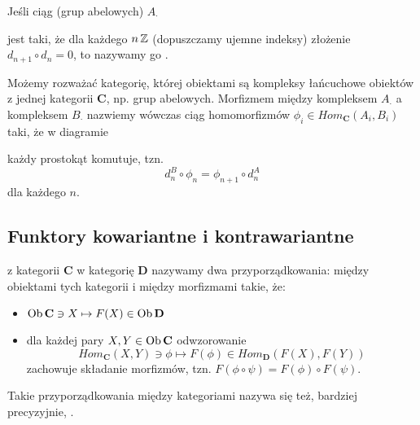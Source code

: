 \begin{definition}
  Jeśli ciąg (grup abelowych) $A_\cdot$
  \begin{center}\end{center}
  jest taki, że dla każdego $n\operatorname{\mathbb{Z}}$ (dopuszczamy ujemne indeksy) złożenie $d_{n+1}\circ d_n=0$, to nazywamy go .
\end{definition}

Możemy rozważać kategorię, której obiektami są kompleksy łańcuchowe obiektów z jednej kategorii $\mathbf{C}$, np. grup abelowych. Morfizmem między kompleksem $A_\cdot$ a kompleksem $B_\cdot$ nazwiemy wówczas ciąg homomorfizmów $\phi_i\in Hom_{\mathbf{C}}(A_i,B_i)$ taki, że w diagramie
  \begin{center}\end{center}
każdy prostokąt komutuje, tzn.
$$d^B_n\circ\phi_n=\phi_{n+1}\circ d_{n}^A$$
dla każdego $n$.

\subsection{Funktory kowariantne i kontrawariantne}

\begin{definition}[funktor]
   z kategorii $\mathbf{C}$ w kategorię $\mathbf{D}$ nazywamy dwa przyporządkowania: między obiektami tych kategorii i między morfizmami takie, że:
  \begin{itemize}
    \item $\operatorname{Ob}\mathbf{C}\ni X\mapsto F(X)\in\operatorname{Ob}\mathbf{D}$
    \item dla każdej pary $X,Y\in\operatorname{Ob}\mathbf{C}$ odwzorowanie
      $$Hom_{\mathbf{C}}(X, Y)\ni \phi\mapsto F(\phi)\in Hom_{\mathbf{D}}(F(X),F(Y))$$
      zachowuje składanie morfizmów, tzn. $F(\phi\circ\psi)=F(\phi)\circ F(\psi)$.
  \end{itemize}

  Takie przyporządkowania między kategoriami nazywa się też, bardziej precyzyjnie, .
\end{definition}

